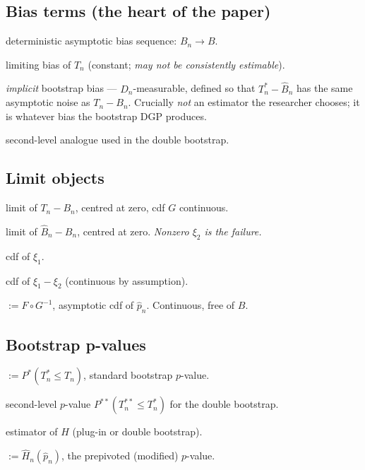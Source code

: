 \documentclass[11pt]{article}
\theoremstyle{definition}
\newcommand{\Pstar}{P^{*}}
\newcommand{\Pstst}{P^{**}}
\newcommand{\Tn}{T_{n}}
\newcommand{\Tns}{T_{n}^{*}}
\newcommand{\Tnss}{T_{n}^{**}}
\newcommand{\Bn}{B_{n}}
\newcommand{\Bnh}{\hat{B}_{n}}
\newcommand{\Bnhs}{\hat{B}_{n}^{*}}
\newcommand{\pnh}{\hat{p}_{n}}
\newcommand{\pnhs}{\hat{p}_{n}^{*}}
\newcommand{\pnt}{\tilde{p}_{n}}
\newcommand{\Hnh}{\hat{H}_{n}}
\newcommand{\Dn}{D_{n}}
\begin{document}
\subsection*{Bias terms (the heart of the paper)}
\begin{description}[leftmargin=2.6cm,style=nextline]
  \item[$\Bn$] deterministic asymptotic bias sequence: $\Bn\to B$.
  \item[$B$] limiting bias of $\Tn$ (constant; \emph{may not be consistently estimable}).
  \item[$\Bnh$] \emph{implicit} bootstrap bias --- $\Dn$-measurable, defined so that
    $\Tns-\Bnh$ has the same asymptotic noise as $\Tn-\Bn$. Crucially \emph{not} an estimator the researcher chooses; it is whatever bias the bootstrap DGP produces.
  \item[$\Bnhs$] second-level analogue used in the double bootstrap.
\end{description}

\subsection*{Limit objects}
\begin{description}[leftmargin=2.6cm,style=nextline]
  \item[$\xi_1$] limit of $\Tn-\Bn$, centred at zero, cdf $G$ continuous.
  \item[$\xi_2$] limit of $\Bnh-\Bn$, centred at zero. \emph{Nonzero $\xi_2$ is the failure.}
  \item[$G$] cdf of $\xi_1$.
  \item[$F$] cdf of $\xi_1-\xi_2$ (continuous by assumption).
  \item[$H$] $:= F\circ G^{-1}$, asymptotic cdf of $\pnh$. Continuous, free of $B$.
\end{description}

\subsection*{Bootstrap p-values}
\begin{description}[leftmargin=2.6cm,style=nextline]
  \item[$\pnh$] $:= \Pstar(\Tns\le \Tn)$, standard bootstrap $p$-value.
  \item[$\pnhs$] second-level $p$-value $\Pstst(\Tnss\le\Tns)$ for the double bootstrap.
  \item[$\Hnh$] estimator of $H$ (plug-in or double bootstrap).
  \item[$\pnt$] $:= \Hnh(\pnh)$, the prepivoted (modified) $p$-value.
\end{description}
\end{document}
